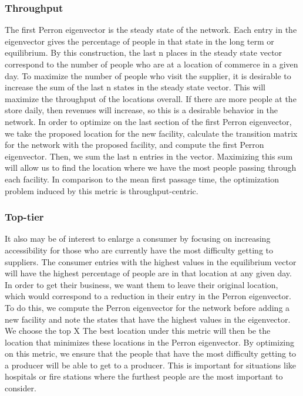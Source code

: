 \documentclass[twoside,twocolumn]{article}
\begin{document}
\subsubsection{Throughput}
The first Perron eigenvector is the steady state of the network. %
Each entry in the eigenvector gives the percentage of people in that state in the long term or equilibrium. %
By this construction, the last n places in the steady state vector correspond to the number of people who are at a location of commerce in a given day.
To maximize the number of people who visit the supplier, it is desirable to increase the sum of the last n states in the steady state vector.
This will maximize the throughput of the locations overall.
If there are more people at the store daily, then revenues will increase, so this is a desirable behavior in the network.
In order to optimize on the last section of the first Perron eigenvector, we take the proposed location for the new facility, calculate the transition matrix for the network with the proposed facility, and compute the first Perron eigenvector.
Then, we sum the last n entries in the vector.
Maximizing this sum will allow us to find the location where we have the most people passing through each facility.
In comparison to the mean first passage time, the optimization problem induced by this metric is throughput-centric.

\subsubsection{Top-tier}
It also may be of interest to enlarge a consumer by focusing on increasing accessibility for those who are currently have the most difficulty getting to suppliers.
The consumer entries with the highest values in the equilibrium vector will have the highest percentage of people are in that location at any given day.
In order to get their business, we want them to leave their original location, which would correspond to a reduction in their entry in the Perron eigenvector.
To do this, we compute the Perron eigenvector for the network before adding a new facility and note the states that have the highest values in the eigenvector.
We choose the top X%
The best location under this metric will then be the location that minimizes these locations in the Perron eigenvector.
By optimizing on this metric, we ensure that the people that have the most difficulty getting to a producer will be able to get to a producer.
This is important for situations like hospitals or fire stations where the furthest people are the most important to consider.
\end{document}
